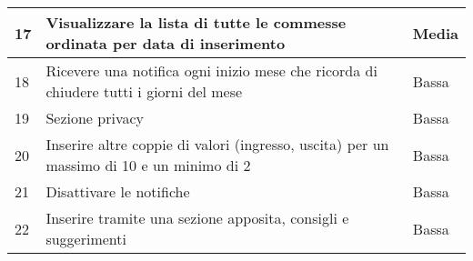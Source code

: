 \begin{table}
\begin{tabular}{||l||l|l|}
		17 & Visualizzare la lista di tutte le commesse ordinata per data di inserimento & Media \\ \hline
		18 & Ricevere una notifica ogni inizio mese che ricorda di chiudere tutti i giorni del mese & Bassa \\ \hline
		19 & Sezione privacy & Bassa \\ \hline
		20 & Inserire altre coppie di valori (ingresso, uscita) per un massimo di 10 e un minimo di 2 & Bassa \\ \hline
		21 & Disattivare le notifiche & Bassa \\ \hline
		22 & Inserire tramite una sezione apposita, consigli e suggerimenti & Bassa \\ \hline
	\end{tabular}
\end{table}